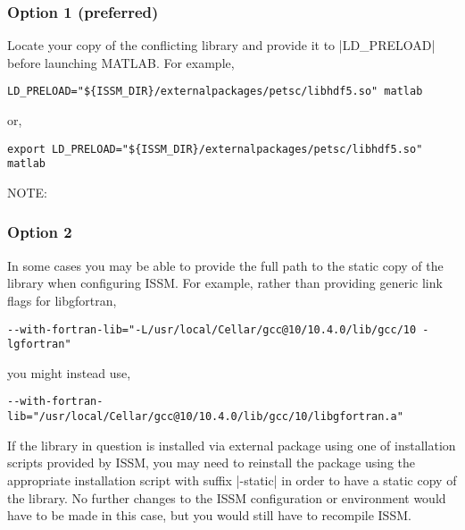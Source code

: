 \subsubsection{Option 1 (preferred)}
Locate your copy of the conflicting library and provide it to \lstinlinebg|LD_PRELOAD| before launching MATLAB. For example,
\begin{lstlisting}
LD_PRELOAD="${ISSM_DIR}/externalpackages/petsc/libhdf5.so" matlab
\end{lstlisting}
or,
\begin{lstlisting}
export LD_PRELOAD="${ISSM_DIR}/externalpackages/petsc/libhdf5.so"
matlab
\end{lstlisting}

NOTE:

\subsubsection{Option 2}
In some cases you may be able to provide the full path to the static copy of the library when configuring ISSM. For example, rather than providing generic link flags for libgfortran,
\begin{lstlisting}
--with-fortran-lib="-L/usr/local/Cellar/gcc@10/10.4.0/lib/gcc/10 -lgfortran"
\end{lstlisting}
you might instead use,
\begin{lstlisting}
--with-fortran-lib="/usr/local/Cellar/gcc@10/10.4.0/lib/gcc/10/libgfortran.a"
\end{lstlisting}

If the library in question is installed via external package using one of installation scripts provided by ISSM, you may need to reinstall the package using the appropriate installation script with suffix \lstinlinebg|-static| in order to have a static copy of the library. No further changes to the ISSM configuration or environment would have to be made in this case, but you would still have to recompile ISSM.

